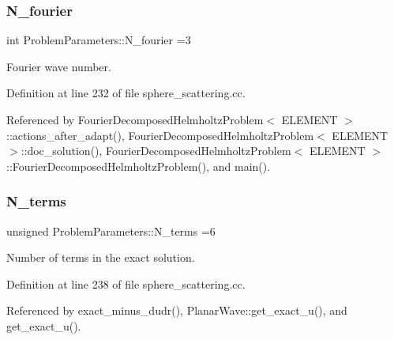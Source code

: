 \mbox{\label{namespaceProblemParameters_aaa674958a1ca6ee0b99de3377288c93f}} 
\subsubsection{\texorpdfstring{N\+\_\+fourier}{N\_fourier}}
{\footnotesize\ttfamily int Problem\+Parameters\+::\+N\+\_\+fourier =3}



Fourier wave number. 



Definition at line 232 of file sphere\+\_\+scattering.\+cc.



Referenced by Fourier\+Decomposed\+Helmholtz\+Problem$<$ E\+L\+E\+M\+E\+N\+T $>$\+::actions\+\_\+after\+\_\+adapt(), Fourier\+Decomposed\+Helmholtz\+Problem$<$ E\+L\+E\+M\+E\+N\+T $>$\+::doc\+\_\+solution(), Fourier\+Decomposed\+Helmholtz\+Problem$<$ E\+L\+E\+M\+E\+N\+T $>$\+::\+Fourier\+Decomposed\+Helmholtz\+Problem(), and main().

\mbox{\label{namespaceProblemParameters_a6361f0f1c4a120e62d28db64baa84b40}} 
\subsubsection{\texorpdfstring{N\+\_\+terms}{N\_terms}}
{\footnotesize\ttfamily unsigned Problem\+Parameters\+::\+N\+\_\+terms =6}



Number of terms in the exact solution. 



Definition at line 238 of file sphere\+\_\+scattering.\+cc.



Referenced by exact\+\_\+minus\+\_\+dudr(), Planar\+Wave\+::get\+\_\+exact\+\_\+u(), and get\+\_\+exact\+\_\+u().

\mbox{\label{namespaceProblemParameters_aa529b33b7feb959e0c044447bf0f6c6f}} 
